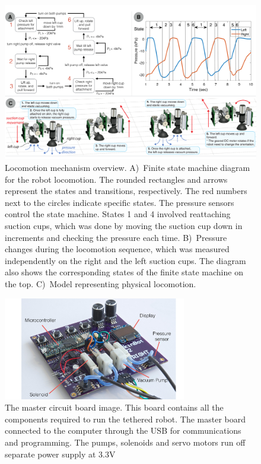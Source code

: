 \begin{figure}[!ht]
\centering
\includegraphics[width=14.0cm]{pictures/chapter3/locomotion_mechanism.pdf}
\caption{Locomotion mechanism overview. A)~Finite state machine diagram for the robot locomotion. The rounded rectangles and arrows represent the states and transitions, respectively. The red numbers next to the circles indicate specific states. The pressure sensors control the state machine. States 1 and 4 involved reattaching suction cups, which was done by moving the suction cup down in increments and checking the pressure each time. B)~Pressure changes during the locomotion sequence, which was measured independently on the right and the left suction cups. The diagram also shows the corresponding states of the finite state machine on the top. C)~Model representing physical locomotion.}
\label{fig:locomotion_mechanism}
\end{figure}


\begin{figure}[!ht]
\centering
\includegraphics[width=8.0cm]{pictures/chapter3/master_node.pdf}
\caption{The master circuit board image. This board contains all the components required to run the tethered robot. The master board connected to the computer through the USB for communications and programming. The pumps, solenoids and servo motors run off separate power supply at 3.3V}
\label{fig:master_node}
\end{figure}



